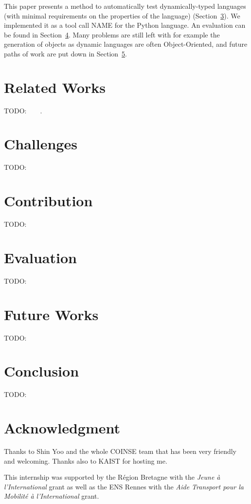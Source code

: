 \documentclass{llncs2e/llncs}
\def\todo#1{{\color{red}TODO:\quad#1}}
\begin{document}
This paper presents a method to automatically test dynamically-typed languages
(with minimal requirements on the properties of the language)
(Section~\ref{contribution}). We implemented it as a tool call NAME for the
Python language. An evaluation can be found in Section~\ref{evaluation}. Many
problems are still left with for example the generation of objects as dynamic
languages are often Object-Oriented, and future paths of work are put down in
Section~\ref{futureworks}.


\section{Related Works}
\label{relatedwork}
\todo{}~\cite{ducasse2011challenges}~\cite{mairhofer2011search}~\cite{splat}~\cite{splats}.


\section{Challenges}
\label{challenges}
\todo{}


\section{Contribution}
\label{contribution}
\todo{}


\section{Evaluation}
\label{evaluation}
\todo{}


\section{Future Works}
\label{futureworks}
\todo{}


\section{Conclusion}
\label{conclusion}
\todo{}


\section*{Acknowledgment}
Thanks to Shin Yoo and the whole COINSE team that has been very friendly and
welcoming. Thanks also to KAIST for hosting me.

This internship was supported by the R\'egion Bretagne with the \textit{Jeune
\`a l'International} grant as well as the ENS Rennes with the \textit{Aide
Transport pour la Mobilit\'e \`a l'International} grant.



\end{document}

